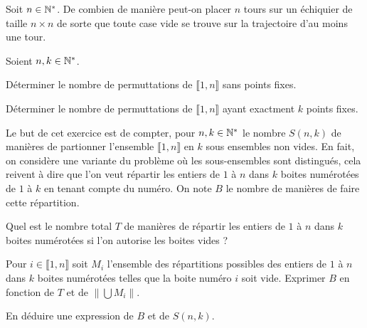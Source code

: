 \documentclass[french]{report}
\begin{document}
\begin{exo}
    Soit \(n\in\mathbb{N}^*\). De combien de manière peut-on placer \(n\) tours sur un échiquier
    de taille \(n\times n\) de sorte que toute case vide se trouve sur la trajectoire
    d'au moins une tour.
\end{exo}

\begin{exo}
    Soient \(n,k\in\mathbb{N}^*\).
    \begin{q}{1}
        Déterminer le nombre de permuttations de \(\llbracket1,n\rrbracket\) sans
        points fixes.
        \boxans{On a la formule de récurrence \(d_n = n(d_{n-1}+d_{n-2})\) %
        Si \(A_i\) est l'esemble des permuttations qui ont \(i\) comme point fixe,
        \(|\cup A_i| = n! - (n-1)! + (n+2)! -\dots\) on retrouve \(\simeq n!(1-frac{1}{e})\).
        donc le nombre qu'on cherche est \(n!\sum \frac{(-1)^n}{e}\).
        }
    \end{q}
    \begin{q}{2}
        Déterminer le nombre de permuttations de \(\llbracket1,n\rrbracket\) ayant
        exactment \(k\) points fixes.
    \end{q}
\end{exo}

\begin{exo}
    Le but de cet exercice est de compter, pour \(n,k\in\mathbb{N}^*\) le nombre \(S(n,k)\)
    de manières de partionner l'ensemble \(\llbracket1,n\rrbracket\) en \(k\) sous
    ensembles non vides. En fait, on considère une variante du problème où les
    sous-ensembles sont distingués, cela reivent à dire que l'on veut répartir les entiers
    de \(1\) à \(n\) dans \(k\) boites numérotées de \(1\) à \(k\) en tenant compte
    du numéro. On note \(B\) le nombre de manières de faire cette répartition.
    \begin{q}{1}
        Quel est le nombre total \(T\) de manières de répartir les entiers de \(1\) à \(n\)
        dans \(k\) boites numérotées si l'on autorise les boites vides ?
    \end{q}
    \begin{q}{2}
        Pour \(i\in\llbracket1,n\rrbracket\) soit \(M_i\) l'ensemble des répartitions
        possibles des entiers de \(1\) à \(n\) dans \(k\) boites numérotées telles que
        la boite numéro \(i\) soit vide. Exprimer \(B\) en fonction de \(T\)
        et de \(\|\bigcup M_i\|\).
    \end{q}
    \begin{q}{3}
        En déduire une expression de \(B\) et de \(S(n,k)\).
    \end{q}
\end{exo}
\end{document}
